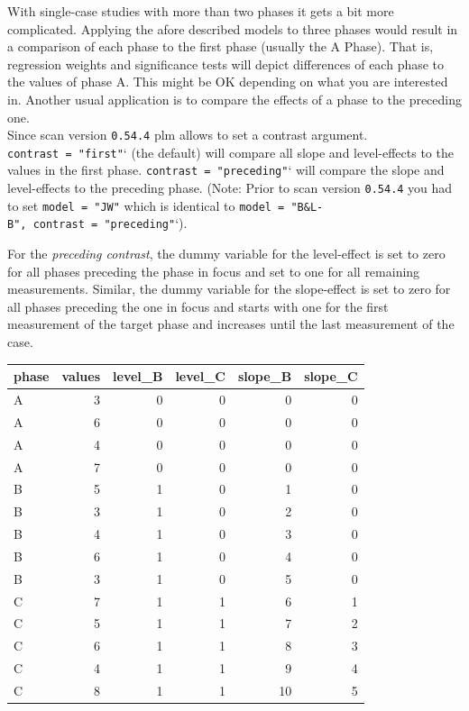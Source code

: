 \documentclass[
  letterpaper,
  DIV=11,
  numbers=noendperiod]{scrreprt}
\begin{document}
With single-case studies with more than two phases it gets a bit more
complicated. Applying the afore described models to three phases would
result in a comparison of each phase to the first phase (usually the A
Phase). That is, regression weights and significance tests will depict
differences of each phase to the values of phase A. This might be OK
depending on what you are interested in. Another usual application is to
compare the effects of a phase to the preceding one.\\
Since scan version \texttt{0.54.4} plm allows to set a contrast
argument. \texttt{contrast\ =\ "first"}` (the default) will compare all
slope and level-effects to the values in the first phase.
\texttt{contrast\ =\ "preceding"}` will compare the slope and
level-effects to the preceding phase. (Note: Prior to scan version
\texttt{0.54.4} you had to set \texttt{model\ =\ "JW"} which is
identical to \texttt{model\ =\ "B\&L-B",\ contrast\ =\ "preceding"}`).

For the \emph{preceding contrast}, the dummy variable for the
level-effect is set to zero for all phases preceding the phase in focus
and set to one for all remaining measurements. Similar, the dummy
variable for the slope-effect is set to zero for all phases preceding
the one in focus and starts with one for the first measurement of the
target phase and increases until the last measurement of the case.

\begin{longtable}[]{@{}lrrrrr@{}}
\toprule()
phase & values & level\_B & level\_C & slope\_B & slope\_C \\
\midrule()
\endhead
A & 3 & 0 & 0 & 0 & 0 \\
A & 6 & 0 & 0 & 0 & 0 \\
A & 4 & 0 & 0 & 0 & 0 \\
A & 7 & 0 & 0 & 0 & 0 \\
B & 5 & 1 & 0 & 1 & 0 \\
B & 3 & 1 & 0 & 2 & 0 \\
B & 4 & 1 & 0 & 3 & 0 \\
B & 6 & 1 & 0 & 4 & 0 \\
B & 3 & 1 & 0 & 5 & 0 \\
C & 7 & 1 & 1 & 6 & 1 \\
C & 5 & 1 & 1 & 7 & 2 \\
C & 6 & 1 & 1 & 8 & 3 \\
C & 4 & 1 & 1 & 9 & 4 \\
C & 8 & 1 & 1 & 10 & 5 \\
\bottomrule()
\end{longtable}
\end{document}
